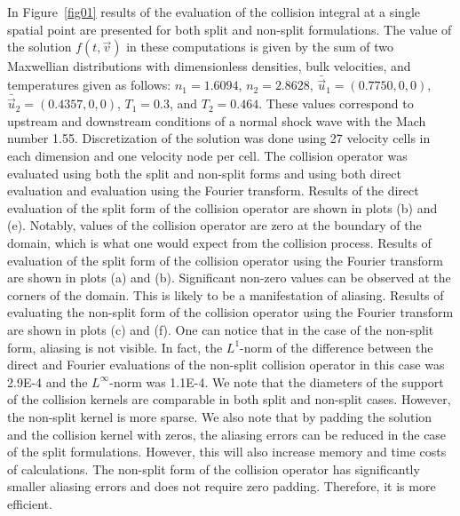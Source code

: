 \documentclass[12pt]{CSUNthesis}
\begin{document}
In Figure~\ref{fig01} results of the evaluation of the collision integral 
at a single spatial point are presented for both split and non-split 
formulations. The value of the solution $f(t,\vec{v})$ in these computations 
is given by the sum of two Maxwellian distributions with dimensionless 
densities, bulk velocities, and temperatures given as follows: $n_{1}=1.6094$, 
$n_{2}=2.8628$, $\bar{\vec{u}}_{1}=(0.7750,0,0)$, $\bar{\vec{u}}_{2}=(0.4357,0,0)$,
$T_{1}=0.3$, and $T_{2}=0.464$. These values correspond to upstream and downstream conditions
of a normal shock wave with the Mach number 1.55. Discretization of the solution was done using 
27 velocity cells in each dimension and one velocity node per cell. The collision operator was 
evaluated using both the split and non-split forms and using both direct evaluation and evaluation 
using the Fourier transform. Results of the direct evaluation of the 
split form of the collision operator are shown in plots (b) and (e). Notably, values 
of the collision operator are zero at the 
boundary of the domain, which is what one would expect from the collision process. Results 
of evaluation of the split form of the collision operator using the Fourier transform are shown in plots (a) and (b). 
Significant non-zero values can be observed at the corners of the domain. This is likely to be 
a manifestation of aliasing. Results of evaluating the non-split form of the collision 
operator using the Fourier transform are shown in plots (c) and (f). One can notice that 
in the case of the non-split form, aliasing is not visible. In fact, the 
$L^{1}$-norm of the difference between the direct and Fourier
evaluations of the non-split collision operator in this case was 2.9E-4 and 
the $L^{\infty}$-norm was 
1.1E-4. We note that the diameters of the support of the collision kernels 
are comparable in both split and non-split cases. However, the non-split kernel is 
more sparse. We also note that by padding the solution and the collision kernel with zeros, 
the aliasing errors can be reduced in the case of the split formulations. However, 
this will also increase memory and time costs of calculations. The non-split form 
of the collision operator has significantly smaller aliasing errors and does not 
require zero padding. Therefore, it is more efficient. 
\end{document}
